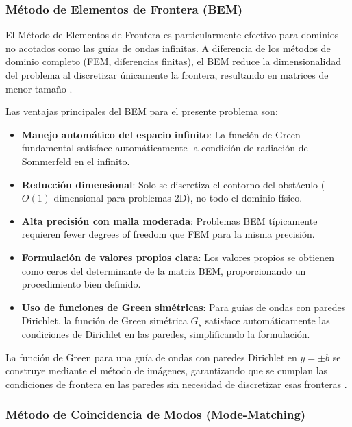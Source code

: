 \documentclass[11pt]{article}
\begin{document}
\subsubsection{Método de Elementos de Frontera (BEM)}

El Método de Elementos de Frontera es particularmente efectivo para dominios no acotados como las guías de ondas infinitas. A diferencia de los métodos de dominio completo (FEM, diferencias finitas), el BEM reduce la dimensionalidad del problema al discretizar únicamente la frontera, resultando en matrices de menor tamaño \cite{Pozrikidis2002}.

Las ventajas principales del BEM para el presente problema son:

\begin{itemize}
\item \textbf{Manejo automático del espacio infinito}: La función de Green fundamental satisface automáticamente la condición de radiación de Sommerfeld en el infinito.

\item \textbf{Reducción dimensional}: Solo se discretiza el contorno del obstáculo ($O(1)$-dimensional para problemas 2D), no todo el dominio físico.

\item \textbf{Alta precisión con malla moderada}: Problemas BEM típicamente requieren fewer degrees of freedom que FEM para la misma precisión.

\item \textbf{Formulación de valores propios clara}: Los valores propios se obtienen como ceros del determinante de la matriz BEM, proporcionando un procedimiento bien definido.

\item \textbf{Uso de funciones de Green simétricas}: Para guías de ondas con paredes Dirichlet, la función de Green simétrica $G_s$ satisface automáticamente las condiciones de Dirichlet en las paredes, simplificando la formulación.
\end{itemize}

La función de Green para una guía de ondas con paredes Dirichlet en $y = \pm b$ se construye mediante el método de imágenes, garantizando que se cumplan las condiciones de frontera en las paredes sin necesidad de discretizar esas fronteras \cite{Linton1992}.

\subsubsection{Método de Coincidencia de Modos (Mode-Matching)}
\end{document}
